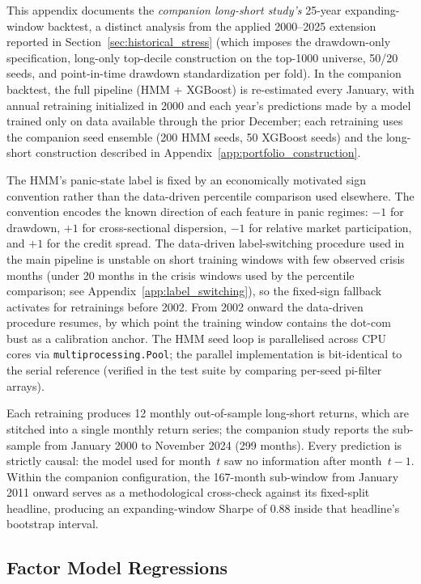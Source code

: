 This appendix documents the \emph{companion long-short study's} 25-year expanding-window backtest, a distinct analysis from the applied 2000--2025 extension reported in Section~\ref{sec:historical_stress} (which imposes the drawdown-only specification, long-only top-decile construction on the top-1000 universe, 50/20 seeds, and point-in-time drawdown standardization per fold). In the companion backtest, the full pipeline (HMM + XGBoost) is re-estimated every January, with annual retraining initialized in 2000 and each year's predictions made by a model trained only on data available through the prior December; each retraining uses the companion seed ensemble (200 HMM seeds, 50 XGBoost seeds) and the long-short construction described in Appendix~\ref{app:portfolio_construction}.

The HMM's panic-state label is fixed by an economically motivated sign convention rather than the data-driven percentile comparison used elsewhere. The convention encodes the known direction of each feature in panic regimes: $-1$ for drawdown, $+1$ for cross-sectional dispersion, $-1$ for relative market participation, and $+1$ for the credit spread. The data-driven label-switching procedure used in the main pipeline is unstable on short training windows with few observed crisis months (under 20 months in the crisis windows used by the percentile comparison; see Appendix~\ref{app:label_switching}), so the fixed-sign fallback activates for retrainings before 2002. From 2002 onward the data-driven procedure resumes, by which point the training window contains the dot-com bust as a calibration anchor. The HMM seed loop is parallelised across CPU cores via \texttt{multiprocessing.Pool}; the parallel implementation is bit-identical to the serial reference (verified in the test suite by comparing per-seed pi-filter arrays).

Each retraining produces 12 monthly out-of-sample long-short returns, which are stitched into a single monthly return series; the companion study reports the sub-sample from January 2000 to November 2024 (299 months). Every prediction is strictly causal: the model used for month~$t$ saw no information after month~$t-1$. Within the companion configuration, the 167-month sub-window from January 2011 onward serves as a methodological cross-check against its fixed-split headline, producing an expanding-window Sharpe of 0.88 inside that headline's bootstrap interval.

\subsection{Factor Model Regressions}\label{app:factor_alphas}

